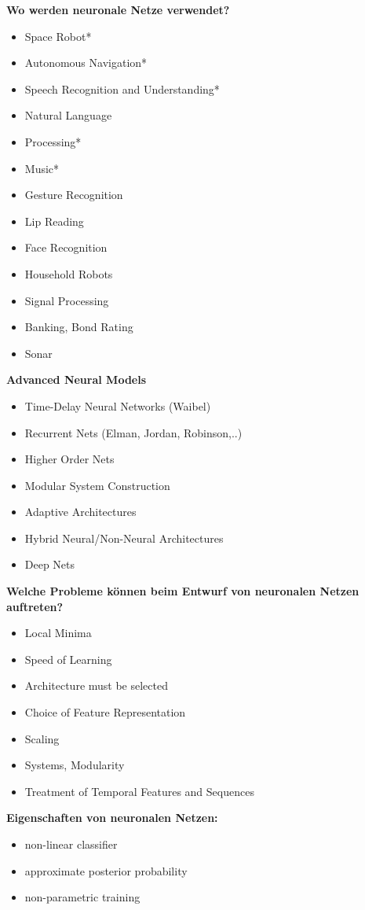 \textbf{Wo werden neuronale Netze verwendet?}
\begin{itemize}
	\item Space Robot*
	\item Autonomous Navigation*
	\item Speech Recognition and Understanding*
	\item Natural Language
	\item Processing*
	\item Music*
	\item Gesture Recognition
	\item Lip Reading
	\item Face Recognition
	\item Household Robots
	\item Signal Processing
	\item Banking, Bond Rating
	\item Sonar
\end{itemize}
\textbf{Advanced Neural Models}
\begin{itemize}
	\item Time-Delay Neural Networks (Waibel)
	\item Recurrent Nets (Elman, Jordan, Robinson,..)
	\item Higher Order Nets
	\item Modular System Construction
	\item Adaptive Architectures
	\item Hybrid Neural/Non-Neural Architectures
	\item Deep Nets
\end{itemize}
\textbf{Welche Probleme können beim Entwurf von neuronalen Netzen auftreten?}
\begin{itemize}
	\item Local Minima
	\item Speed of Learning
	\item Architecture must be selected
	\item Choice of Feature Representation
	\item Scaling
	\item Systems, Modularity
	\item Treatment of Temporal Features and Sequences
\end{itemize}
\textbf{Eigenschaften von neuronalen Netzen:}
\begin{itemize}
	\item non-linear classifier
	\item approximate posterior probability
	\item non-parametric training
\end{itemize}
\newpage